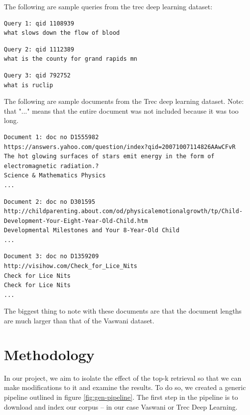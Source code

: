 \documentclass[letterpaper,12pt]{article}
\begin{document}
The following are sample queries from the trec deep learning dataset:

\begin{lstlisting}[frame=single]  
Query 1: qid 1108939
what slows down the flow of blood
\end{lstlisting}

\begin{lstlisting}[frame=single]  
Query 2: qid 1112389
what is the county for grand rapids mn
\end{lstlisting}

\begin{lstlisting}[frame=single]  
Query 3: qid 792752
what is ruclip
\end{lstlisting}

The following are sample documents from the Trec deep learning dataset.
Note: that "..." means that the entire document was not included because it was too long.

\begin{lstlisting}[frame=single]  
Document 1: doc no D1555982
https://answers.yahoo.com/question/index?qid=20071007114826AAwCFvR
The hot glowing surfaces of stars emit energy in the form of electromagnetic radiation.?
Science & Mathematics Physics
...
\end{lstlisting}

\begin{lstlisting}[frame=single]  
Document 2: doc no D301595
http://childparenting.about.com/od/physicalemotionalgrowth/tp/Child-Development-Your-Eight-Year-Old-Child.htm
Developmental Milestones and Your 8-Year-Old Child
...
\end{lstlisting}

\begin{lstlisting}[frame=single]  
Document 3: doc no D1359209
http://visihow.com/Check_for_Lice_Nits
Check for Lice Nits
Check for Lice Nits
...
\end{lstlisting}

The biggest thing to note with these documents are that the document lengths are much larger than that of the Vaswani dataset. 


\section{Methodology}

In our project, we aim to isolate the effect of the top-k retrieval so that we can make modifications to it and examine the results.
To do so, we created a generic pipeline outlined in figure \ref{fig:gen-pipeline}.
The first step in the pipeline is to download and index our corpus -- in our case Vaswani or Trec Deep Learning.
\end{document}
